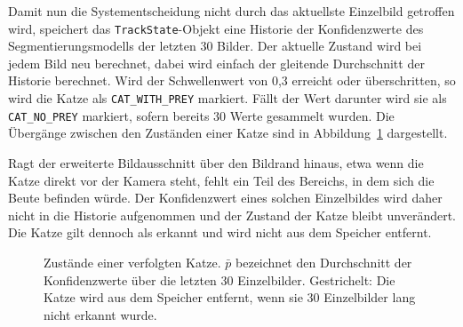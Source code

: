 Damit nun die Systementscheidung nicht durch das aktuellste Einzelbild getroffen wird, speichert das \texttt{TrackState}-Objekt eine Historie der Konfidenzwerte des Segmentierungsmodells der letzten 30 Bilder. Der aktuelle Zustand wird bei jedem Bild neu berechnet, dabei wird einfach der gleitende Durchschnitt der Historie berechnet. Wird der Schwellenwert von 0,3 erreicht oder überschritten, so wird die Katze als \texttt{CAT\_WITH\_PREY} markiert. Fällt der Wert darunter wird sie als \texttt{CAT\_NO\_PREY} markiert, sofern bereits 30 Werte gesammelt wurden. Die Übergänge zwischen den Zuständen einer Katze sind in Abbildung~\ref{fig:zustaende} dargestellt.

Ragt der erweiterte Bildausschnitt über den Bildrand hinaus, etwa wenn die Katze direkt vor der Kamera steht, fehlt ein Teil des Bereichs, in dem sich die Beute befinden würde. Der Konfidenzwert eines solchen Einzelbildes wird daher nicht in die Historie aufgenommen und der Zustand der Katze bleibt unverändert. Die Katze gilt dennoch als erkannt und wird nicht aus dem Speicher entfernt.

\begin{figure}[htbp]
	\centering
	\caption{Zustände einer verfolgten Katze. $\bar{p}$ bezeichnet den Durchschnitt der Konfidenzwerte über die letzten 30 Einzelbilder. Gestrichelt: Die Katze wird aus dem Speicher entfernt, wenn sie 30 Einzelbilder lang nicht erkannt wurde.}
	\label{fig:zustaende}
\end{figure}


